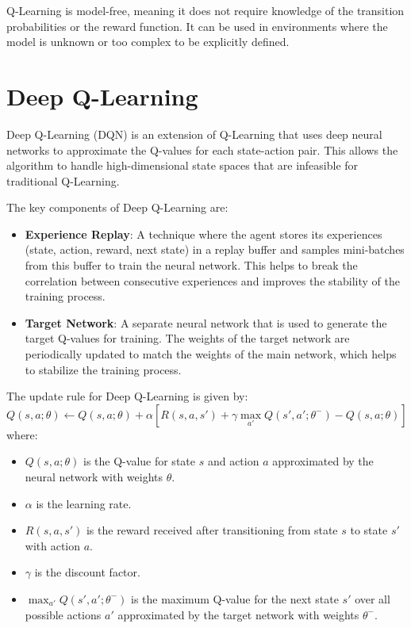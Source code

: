 \documentclass{article}
\begin{document}
Q-Learning is model-free, meaning it does not require knowledge of the transition probabilities or the reward function. It can be used in environments where the model is unknown or too complex to be explicitly defined.

\section{Deep Q-Learning}

Deep Q-Learning (DQN) is an extension of Q-Learning that uses deep neural networks to approximate the Q-values for each state-action pair. This allows the algorithm to handle high-dimensional state spaces that are infeasible for traditional Q-Learning.

The key components of Deep Q-Learning are:
\begin{itemize}
    \item \textbf{Experience Replay}: A technique where the agent stores its experiences (state, action, reward, next state) in a replay buffer and samples mini-batches from this buffer to train the neural network. This helps to break the correlation between consecutive experiences and improves the stability of the training process.
    \item \textbf{Target Network}: A separate neural network that is used to generate the target Q-values for training. The weights of the target network are periodically updated to match the weights of the main network, which helps to stabilize the training process.
\end{itemize}

The update rule for Deep Q-Learning is given by:
\[ 
Q(s, a; \theta) \leftarrow Q(s, a; \theta) + \alpha \left[ R(s, a, s') + \gamma \max_{a'} Q(s', a'; \theta^-) - Q(s, a; \theta) \right]
\]
where:
\begin{itemize}
    \item \( Q(s, a; \theta) \) is the Q-value for state \( s \) and action \( a \) approximated by the neural network with weights \( \theta \).
    \item \( \alpha \) is the learning rate.
    \item \( R(s, a, s') \) is the reward received after transitioning from state \( s \) to state \( s' \) with action \( a \).
    \item \( \gamma \) is the discount factor.
    \item \( \max_{a'} Q(s', a'; \theta^-) \) is the maximum Q-value for the next state \( s' \) over all possible actions \( a' \) approximated by the target network with weights \( \theta^- \).
\end{itemize}
\end{document}
